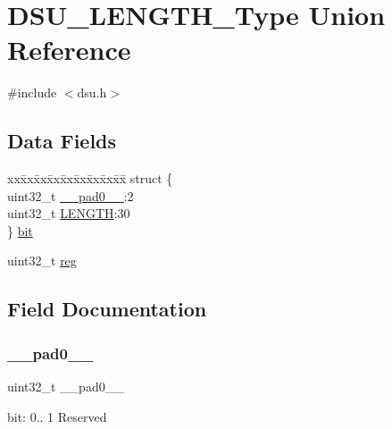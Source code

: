 \hypertarget{union_d_s_u___l_e_n_g_t_h___type}{}\section{D\+S\+U\+\_\+\+L\+E\+N\+G\+T\+H\+\_\+\+Type Union Reference}
\label{union_d_s_u___l_e_n_g_t_h___type}


{\ttfamily \#include $<$dsu.\+h$>$}

\subsection*{Data Fields}
\begin{DoxyCompactItemize}
\item 
\begin{tabbing}
xx\=xx\=xx\=xx\=xx\=xx\=xx\=xx\=xx\=\kill
struct \{\\
\>uint32\_t \mbox{\hyperlink{union_d_s_u___l_e_n_g_t_h___type_a3e57c2ef1c3ffb36722f000cc1156824}{\_\_pad0\_\_}}:2\\
\>uint32\_t \mbox{\hyperlink{union_d_s_u___l_e_n_g_t_h___type_a8daf77f63a1ab40042b7fd517a40e580}{LENGTH}}:30\\
\} \mbox{\hyperlink{union_d_s_u___l_e_n_g_t_h___type_a3a8c00df0be3576592aceb5f59c6cfcb}{bit}}\\

\end{tabbing}\item 
uint32\+\_\+t \mbox{\hyperlink{union_d_s_u___l_e_n_g_t_h___type_a6b91636401516a477989a336376d7b40}{reg}}
\end{DoxyCompactItemize}


\subsection{Field Documentation}
\mbox{\label{union_d_s_u___l_e_n_g_t_h___type_a3e57c2ef1c3ffb36722f000cc1156824}} 
\subsubsection{\texorpdfstring{\_\_pad0\_\_}{\_\_pad0\_\_}}
{\footnotesize\ttfamily uint32\+\_\+t \+\_\+\+\_\+pad0\+\_\+\+\_\+}

bit\+: 0.. 1 Reserved \mbox{\label{union_d_s_u___l_e_n_g_t_h___type_a3a8c00df0be3576592aceb5f59c6cfcb}} 
